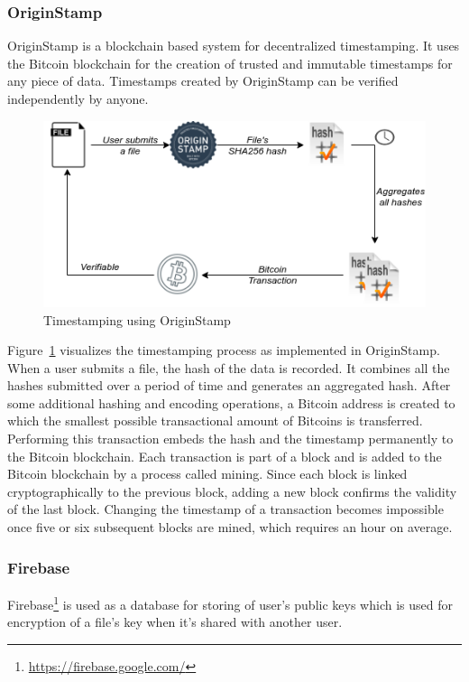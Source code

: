 			\subsubsection{OriginStamp}\label{sec:originstamp}
			OriginStamp\cite{hepp2018originstamp} is a blockchain based system for decentralized timestamping. It uses the Bitcoin blockchain for the creation of trusted and immutable timestamps for any piece of data. Timestamps created by OriginStamp can be verified independently by anyone.
			
			\begin{figure}[h]
				\includegraphics[width=\linewidth]{figures/origin-stamp}
				\caption{\label{fig:originstamp} Timestamping using OriginStamp}
			\end{figure}
			
			Figure~\ref{fig:originstamp} visualizes the timestamping process as implemented in OriginStamp. When a user submits a file, the hash of the data is recorded. It combines all the hashes submitted over a period of time and generates an aggregated hash. After some additional hashing and encoding operations, a Bitcoin address is created to which the smallest possible transactional amount of Bitcoins is transferred. Performing this transaction embeds the hash and the timestamp permanently to the Bitcoin blockchain. Each transaction is part of a block and is added to the Bitcoin blockchain by a process called mining. Since each block is linked cryptographically to the previous block, adding a new block confirms the validity of the last block. Changing the timestamp of a transaction becomes impossible once five or six subsequent blocks are mined, which requires an hour on average\cite{nakamoto2008bitcoin}.
			
			\subsubsection{Firebase}
			Firebase\footnote{\url{https://firebase.google.com/}} is used as a database for storing of user's public keys which is used for encryption of a file's key when it's shared with another user.
			
